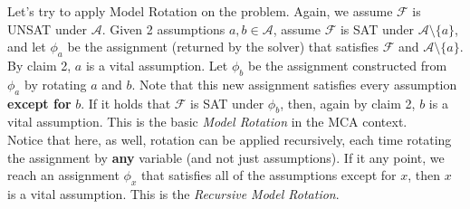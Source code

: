 \documentclass[]{article}
\begin{document}
	Let's try to apply Model Rotation on the problem. Again, we assume $ \mathcal{F} $ is UNSAT under $ \mathcal{A} $. Given 2 assumptions $ a,b \in \mathcal{A} $, assume $ \mathcal{F} $ is SAT under $ \mathcal{A}\setminus \{a\} $, and let $ \phi _a $ be the assignment (returned by the solver) that satisfies $ \mathcal{F} $ and $ \mathcal{A}\setminus \{a\} $. By claim 2, $ a $ is a vital assumption. Let  $ \phi _b $ be the assignment constructed from $ \phi _a $ by rotating $ a $ and $ b $. Note that this new assignment satisfies every assumption \textbf{except for} $ b $. If it holds that $ \mathcal{F} $ is SAT under $ \phi_b $, then, again by claim 2, $ b $ is a vital assumption. This is the basic \textit{Model Rotation} in the MCA context.\\Notice that here, as well, rotation can be applied recursively, each time rotating the assignment by \textbf{any} variable (and not just assumptions). If it any point, we reach an assignment $ \phi _x $ that satisfies all of the assumptions except for $ x $, then $ x $ is a vital assumption. This is the \textit{Recursive Model Rotation}.
\end{document}
